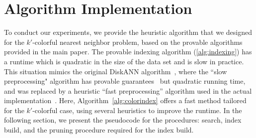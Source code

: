 \newcommand{\mcL}{\mathcal{L}}
\newcommand{\mcV}{\mathcal{V}}

\section{Algorithm Implementation} \label{sec:impl}
To conduct our experiments, we provide the heuristic algorithm that we designed for the $k'$-colorful nearest neighbor problem, based on the provable algorithms provided in the main paper. The provable indexing algorithm (\ref{alg:indexing}) has a runtime which is quadratic in the size of the data set and is slow in practice. This situation mimics the original DiskANN algorithm~\cite{jayaram2019diskann}, where the ``slow preprocessing" algorithm  has provable guarantees~\cite{indykxu2024worst} but quadratic running time, and was replaced by a heuristic ``fast preprocessing'' algorithm used in the actual implementation~\cite{DiskANN}. 
Here, Algorithm~\ref{alg:colorindex} offers a fast method tailored for the $k'$-colorful case, using several heuristics to improve the runtime. In the following section, we present the pseudocode for the procedures: search, index build, and the pruning procedure required for the index build.



